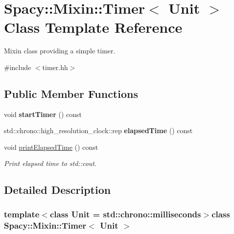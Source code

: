 \hypertarget{classSpacy_1_1Mixin_1_1Timer}{\section{Spacy\-:\-:Mixin\-:\-:Timer$<$ Unit $>$ Class Template Reference}
\label{classSpacy_1_1Mixin_1_1Timer}
}


Mixin class providing a simple timer.  




{\ttfamily \#include $<$timer.\-hh$>$}

\subsection*{Public Member Functions}
\begin{DoxyCompactItemize}
\item 
\hypertarget{classSpacy_1_1Mixin_1_1Timer_acf3c292b6d482c7c4ded5f961be4bc4b}{void {\bfseries start\-Timer} () const }\label{classSpacy_1_1Mixin_1_1Timer_acf3c292b6d482c7c4ded5f961be4bc4b}

\item 
\hypertarget{classSpacy_1_1Mixin_1_1Timer_ab27a20d8e1e9bc90ea56cb18ff752798}{std\-::chrono\-::high\-\_\-resolution\-\_\-clock\-::rep {\bfseries elapsed\-Time} () const }\label{classSpacy_1_1Mixin_1_1Timer_ab27a20d8e1e9bc90ea56cb18ff752798}

\item 
\hypertarget{classSpacy_1_1Mixin_1_1Timer_a3b79b35213702118d0823f6040d5a315}{void \hyperlink{classSpacy_1_1Mixin_1_1Timer_a3b79b35213702118d0823f6040d5a315}{print\-Elapsed\-Time} () const }\label{classSpacy_1_1Mixin_1_1Timer_a3b79b35213702118d0823f6040d5a315}

\begin{DoxyCompactList}\small\item\em Print elapsed time to std\-::cout. \end{DoxyCompactList}\end{DoxyCompactItemize}


\subsection{Detailed Description}
\subsubsection*{template$<$class Unit = std\-::chrono\-::milliseconds$>$class Spacy\-::\-Mixin\-::\-Timer$<$ Unit $>$}

